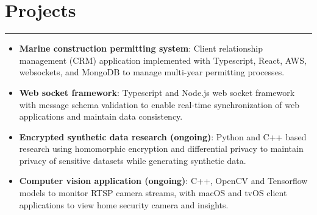 \documentclass[letterpaper,11pt]{article}
\begin{document}
\section*{Projects}
\hrule
\begin{itemize}[leftmargin=*,nosep]
  \item \textbf{Marine construction permitting system}: Client relationship management (CRM) application implemented with Typescript, React, AWS, websockets, and MongoDB to manage multi-year permitting processes.
  \item \textbf{Web socket framework}: Typescript and Node.js web socket framework with message schema validation to enable real-time synchronization of web applications and maintain data consistency.
  \item \textbf{Encrypted synthetic data research (ongoing)}: Python and C++ based research using homomorphic encryption and differential privacy to maintain privacy of sensitive datasets while generating synthetic data.
  \item \textbf{Computer vision application (ongoing)}: C++, OpenCV and Tensorflow models to monitor RTSP camera streams, with macOS and tvOS client applications to view home security camera and insights.
\end{itemize}

\vspace{-10px}
\end{document}
